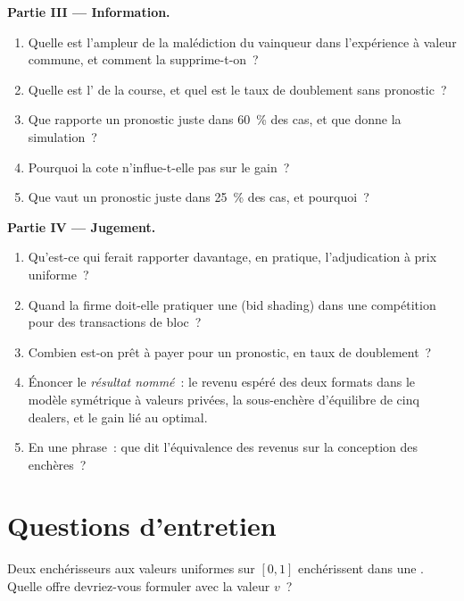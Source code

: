 \begin{problem}
\medskip\noindent\textbf{Partie III --- Information.}
\begin{enumerate}[resume]
\item Quelle est l'ampleur de la malédiction du vainqueur dans l'expérience à valeur commune, et comment la supprime-t-on~?
\item Quelle est l' de la course, et quel est le taux de doublement sans pronostic~?
\item Que rapporte un pronostic juste dans 60~\% des cas, et que donne la simulation~?
\item Pourquoi la cote n'influe-t-elle pas sur le gain~?
\item Que vaut un pronostic juste dans 25~\% des cas, et pourquoi~?
\end{enumerate}

\medskip\noindent\textbf{Partie IV --- Jugement.}
\begin{enumerate}[resume]
\item Qu'est-ce qui ferait rapporter davantage, en pratique, l'adjudication à prix uniforme~?
\item Quand la firme doit-elle pratiquer une  (bid shading) dans une compétition pour des transactions de bloc~?
\item Combien est-on prêt à payer pour un pronostic, en taux de doublement~?
\item Énoncer le \emph{résultat nommé}~: le revenu espéré des deux formats dans le modèle symétrique à valeurs privées, la sous-enchère d'équilibre de cinq dealers, et le gain lié au  optimal.
\item En une phrase~: que dit l'équivalence des revenus sur la conception des enchères~?
\end{enumerate}
\end{problem}

\section{Questions d'entretien}

\begin{interviewq}\label{iq:qm:games-auctions-and-information:1}
Deux enchérisseurs aux valeurs uniformes sur $[0, 1]$ enchérissent dans une . Quelle offre devriez-vous formuler avec la valeur $v$~?
\end{interviewq}

